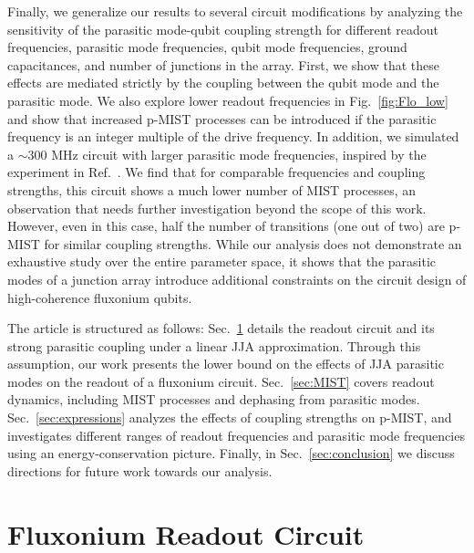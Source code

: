 \documentclass[%
reprint,
superscriptaddress,
 amsmath,amssymb,
 aps,
 prx,
longbibliography,
floatfix,
]{revtex4-2}
\begin{document}
Finally, we generalize our results to several circuit modifications by analyzing the sensitivity of the parasitic mode-qubit coupling strength for different readout frequencies, parasitic mode frequencies, qubit mode frequencies, ground capacitances, and number of junctions in the array. First, we show that these effects are mediated strictly by the coupling between the qubit mode and the parasitic mode. We also explore lower readout frequencies in Fig.~\ref{fig:Flo_low} and show that increased p-MIST processes can be introduced if the parasitic frequency is an integer multiple of the drive frequency. In addition, we simulated a $\sim 300$ MHz circuit with larger parasitic mode frequencies, inspired by the experiment in Ref.~\cite{ding_high-fidelity_2023}. We find that for comparable frequencies and coupling strengths, this circuit shows a much lower number of MIST processes, an observation that needs further investigation beyond the scope of this work. However, even in this case, half the number of transitions (one out of two) are p-MIST for similar coupling strengths. While our analysis does not demonstrate an exhaustive study over the entire parameter space, it shows that the parasitic modes of a junction array introduce additional constraints on the circuit design of high-coherence fluxonium qubits.


The article is structured as follows: Sec.~\ref{sec:Fluxonium} details the readout circuit and its strong parasitic coupling under a linear JJA approximation. Through this assumption, our work presents the lower bound on the effects of JJA parasitic modes on the readout of a fluxonium circuit. Sec.~\ref{sec:MIST} covers readout dynamics, including MIST processes and dephasing from parasitic modes. Sec.~\ref{sec:expressions} analyzes the effects of coupling strengths on p-MIST, and investigates different ranges of readout frequencies and parasitic mode frequencies using an energy-conservation picture. Finally, in Sec.~\ref{sec:conclusion} we discuss directions for future work towards our analysis.

\section{Fluxonium Readout Circuit}\label{sec:Fluxonium}
\end{document}
